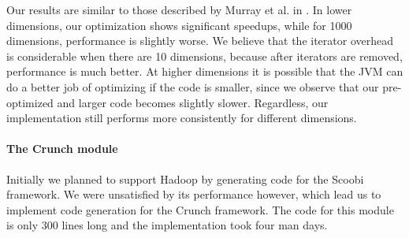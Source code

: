 Our results are similar to those described by Murray et al. in
\cite{murray_steno:_2011}. In lower dimensions, our optimization shows
significant speedups, while for 1000 dimensions, performance is
slightly worse. We believe that the iterator overhead is considerable when
there are 10 dimensions, because after iterators are removed, performance is
much better.
At higher dimensions it is possible that the JVM can do a better job of
optimizing if the code is smaller, since we observe that our pre-optimized and
larger code becomes slightly slower. Regardless, our implementation
still performs more consistently for different dimensions.


\paragraph{The Crunch module}
Initially we planned to support Hadoop by generating code for the Scoobi
\cite{scoobi} framework. We were unsatisfied by its performance however, which
lead us to implement code generation for the Crunch framework. The code for
this module is only 300 lines long and the implementation took four man days.
